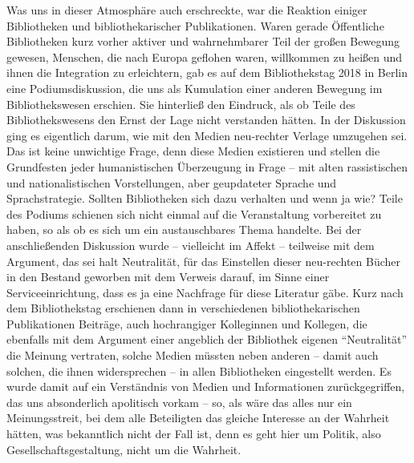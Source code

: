 \documentclass[a4paper,
fontsize=11pt,
oneside,
numbers=noperiodatend,
parskip=half-,
bibliography=totoc,
final
]{scrartcl}
\begin{document}
Was uns in dieser Atmosphäre auch erschreckte, war die Reaktion einiger
Bibliotheken und bibliothekarischer Publikationen. Waren gerade
Öffentliche Bibliotheken kurz vorher aktiver und wahrnehmbarer Teil der
großen Bewegung gewesen, Menschen, die nach Europa geflohen waren,
willkommen zu heißen und ihnen die Integration zu erleichtern, gab es
auf dem Bibliothekstag 2018 in Berlin eine Podiumsdiskussion, die uns
als Kumulation einer anderen Bewegung im Bibliothekswesen erschien. Sie
hinterließ den Eindruck, als ob Teile des Bibliothekswesens den Ernst
der Lage nicht verstanden hätten. In der Diskussion ging es eigentlich
darum, wie mit den Medien neu-rechter Verlage umzugehen sei. Das ist
keine unwichtige Frage, denn diese Medien existieren und stellen die
Grundfesten jeder humanistischen Überzeugung in Frage -- mit alten
rassistischen und nationalistischen Vorstellungen, aber geupdateter
Sprache und Sprachstrategie. Sollten Bibliotheken sich dazu verhalten
und wenn ja wie? Teile des Podiums schienen sich nicht einmal auf die
Veranstaltung vorbereitet zu haben, so als ob es sich um ein
austauschbares Thema handelte. Bei der anschließenden Diskussion wurde
-- vielleicht im Affekt -- teilweise mit dem Argument, das sei halt
Neutralität, für das Einstellen dieser neu-rechten Bücher in den Bestand
geworben mit dem Verweis darauf, im Sinne einer Serviceeinrichtung, dass
es ja eine Nachfrage für diese Literatur gäbe. Kurz nach dem
Bibliothekstag erschienen dann in verschiedenen bibliothekarischen
Publikationen Beiträge, auch hochrangiger Kolleginnen und Kollegen, die
ebenfalls mit dem Argument einer angeblich der Bibliothek eigenen
\enquote{Neutralität} die Meinung vertraten, solche Medien müssten neben
anderen -- damit auch solchen, die ihnen widersprechen -- in allen
Bibliotheken eingestellt werden. Es wurde damit auf ein Verständnis von
Medien und Informationen zurückgegriffen, das uns absonderlich
apolitisch vorkam -- so, als wäre das alles nur ein Meinungsstreit, bei
dem alle Beteiligten das gleiche Interesse an der Wahrheit hätten, was
bekanntlich nicht der Fall ist, denn es geht hier um Politik, also
Gesellschaftsgestaltung, nicht um die Wahrheit.
\end{document}
